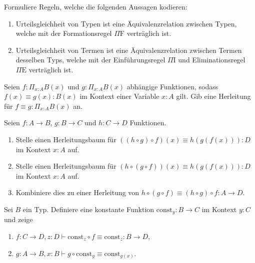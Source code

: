 \documentclass{uebung}
\begin{document}

\begin{exercise}
  Formuliere Regeln, welche die folgenden Aussagen kodieren:
  \begin{enumerate}
    \item Urteilsgleichheit von Typen ist eine Äquivalenzrelation zwischen Typen, welche mit der Formationsregel $\Pi\mathrm{F}$ verträglich ist.
    \item Urteilsgleichheit von Termen ist eine Äquivalenzrelation zwischen Termen desselben Typs, welche mit der Einführungsregel $\Pi\mathrm{I}$ und Eliminationsregel $\Pi\mathrm{E}$ verträglich ist.
  \end{enumerate}
\end{exercise}

\begin{exercise}
  Seien $f:\Pi_{x:A}B(x)$ und $g:\Pi_{x:A}B(x)$ abhängige Funktionen, sodass $f(x)\equiv g(x):B(x)$ im Kontext einer Variable $x:A$ gilt.
  Gib eine Herleitung für $f\equiv g:\Pi_{x:A}B(x)$ an.
\end{exercise}

\begin{exercise}
  Seien $f:A\to B$, $g:B\to C$ und $h:C\to D$ Funktionen.
  \begin{enumerate}
    \item Stelle einen Herleitungsbaum für $((h\circ g)\circ f)(x)\equiv h(g(f(x))):D$ im Kontext $x:A$ auf.
    \item Stelle einen Herleitungsbaum für $(h\circ (g\circ f))(x)\equiv h(g(f(x))):D$ im Kontext $x:A$ auf.
    \item Kombiniere dies zu einer Herleitung von $h\circ(g\circ f)\equiv (h\circ g)\circ f:A\to D$.
  \end{enumerate}
\end{exercise}

\begin{exercise}
  Sei $B$ ein Typ.
  Definiere eine konstante Funktion $\mathrm{const}_y:B\to C$ im Kontext $y:C$ und zeige
  \begin{enumerate}
    \item $f:C\to D,z:D\vdash\mathrm{const}_z\circ f \equiv \mathrm{const}_z:B\to D$,
    \item $g:A\to B, x:B\vdash g\circ\mathrm{const}_y \equiv \mathrm{const}_{g(x)}$.
  \end{enumerate}
\end{exercise}
\end{document}
